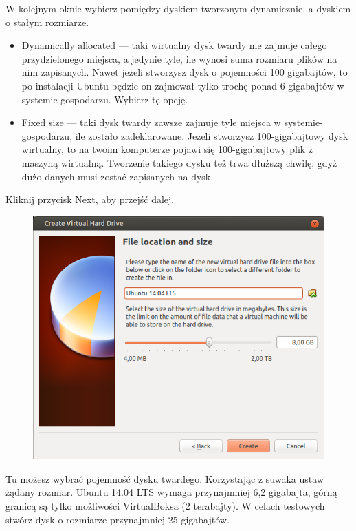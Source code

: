 W kolejnym oknie wybierz pomiędzy dyskiem tworzonym dynamicznie, a dyskiem o stałym rozmiarze.
\begin{itemize}
\item \textcolor{ubuntu_orange}{Dynamically allocated} --- taki wirtualny dysk twardy nie zajmuje całego przydzielonego miejsca, a jedynie tyle, ile wynosi suma rozmiaru plików na nim zapisanych. Nawet jeżeli stworzysz dysk o pojemności 100 gigabajtów, to po instalacji Ubuntu będzie on zajmował tylko trochę ponad 6 gigabajtów w systemie-gospodarzu. Wybierz tę opcję.
\item \textcolor{ubuntu_orange}{Fixed size} --- taki dysk twardy zawsze zajmuje tyle miejsca w systemie-gospodarzu, ile zostało zadeklarowane. Jeżeli stworzysz 100-gigabajtowy dysk wirtualny, to na twoim komputerze pojawi się 100-gigabajtowy plik z maszyną wirtualną. Tworzenie takiego dysku też trwa dłuższą chwilę, gdyż dużo danych musi zostać zapisanych na dysk.
\end{itemize}
\begin{flushright}
Kliknij przycisk \textcolor{ubuntu_orange}{Next}, aby przejść dalej.
\end{flushright}
\clearpage
\begin{figure}
	\vspace{-10pt}
	\includegraphics[width=\linewidth]{images/virtualbox_wizard6.png}
\end{figure}

Tu możesz wybrać pojemność dysku twardego. Korzystając z suwaka ustaw żądany rozmiar. Ubuntu 14.04 LTS wymaga przynajmniej 6,2 gigabajta, górną granicą są tylko możliwości VirtualBoksa (2 terabajty). W celach testowych stwórz dysk o rozmiarze przynajmniej 25 gigabajtów.

